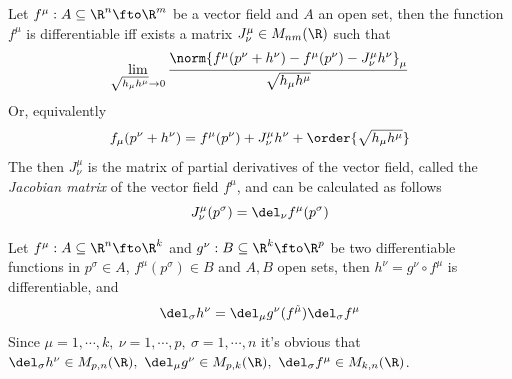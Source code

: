 \documentclass[../mmf.tex]{subfiles}
\begin{document}
\begin{thm}
	Let $f^\mu:A\subseteq\R^n\fto\R^m$ be a vector field and $A$ an open set, then the function $f^\mu$ is differentiable iff exists a matrix $J^\mu_\nu\in M_{nm}(\R)$ such that
	\begin{equation}
		\lim_{\sqrt{h_\mu h^\mu}\to0}\frac{\norm{f^\mu(p^\nu+h^\nu)-f^\mu(p^\nu)-J^\mu_\nu h^\nu}_{\mu}}{\sqrt{h_\mu h^\mu}}
		\label{eq:jacmatrix}
	\end{equation}
	Or, equivalently
	\begin{equation}
		f_\mu(p^\nu+h^\nu)=f^\mu(p^\nu)+J^\mu_\nu h^\nu+\order{\sqrt{h_\mu h^\mu}}
		\label{eq:diffvf}
	\end{equation}
	The then $J^\mu_\nu$ is the matrix of partial derivatives of the vector field, called the \textit{Jacobian matrix} of the vector field $f^\mu$, and can be calculated as follows
	\begin{equation}
		J^\mu_\nu(p^\sigma)=\del_\nu f^\mu(p^\sigma)
		\label{eq:jacobian}
	\end{equation}
\end{thm}
\begin{thm}
	Let $f^\mu:A\subseteq\R^n\fto\R^k$ and $g^\nu:B\subseteq\R^k\fto\R^p$ be two differentiable functions in $p^\sigma\in A$, $f^\mu(p^\sigma)\in B$ and $A,B$ open sets, then $h^\nu=g^\nu\circ f^\mu$ is differentiable, and
	\begin{equation}
		\del_\sigma h^\nu=\del_\mu g^\nu(f^{\tilde{\mu}})\del_\sigma f^\mu
		\label{eq:compdervf}
	\end{equation}%
	Since $\mu=1,\cdots,k,\ \nu=1,\cdots,p,\ \sigma=1,\cdots,n$ it's obvious that $\del_\sigma h^\nu\in M_{p,n}(\R),\ \del_\mu g^\nu\in M_{p,k}(\R),\ \del_\sigma f^\mu\in M_{k,n}(\R)$.
\end{thm}
\end{document}
